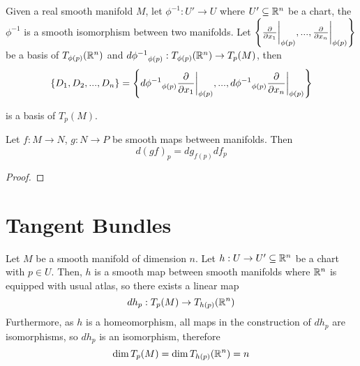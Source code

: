 \begin{remark}
	Given a real smooth manifold $M$, let $\phi^{-1}: U' \to U$ where $U' \subseteq \R^n$ be a chart, the $\phi^{-1}$ is a smooth isomorphism between two manifolds. Let $\set*{\frac{\partial}{\partial x_1}\bigg\vert_{\phi(p)}, ..., \frac{\partial}{\partial x_n}\bigg\vert_{\phi(p)}}$ be a basis of $T_{\phi(p)}(\R^n)$ and $d {\phi^{-1}}_{\phi(p)}: T_{\phi(p)}(\R^n) \to T_p(M)$, then
	$$
	\set{D_1, D_2, ..., D_n} = \set*{d {\phi^{-1}}_{\phi(p)}\frac{\partial}{\partial x_1}\bigg\vert_{\phi(p)}, ..., d {\phi^{-1}}_{\phi(p)}\frac{\partial}{\partial x_n}\bigg\vert_{\phi(p)}}
	$$
	
	is a basis of $T_p(M)$. 
\end{remark}

\begin{proposition}
	Let $f: M \to N$, $g: N \to P$ be smooth maps between manifolds. Then
	$$
	d(gf)_p = dg_{f(p)} df_p
	$$
	\begin{proof}
	\end{proof}
\end{proposition}

\section{Tangent Bundles}

\begin{proposition}
	Let $M$ be a smooth manifold of dimension $n$. Let $h: U \to U' \subseteq \R^n$ be a chart with $p \in U$. Then, $h$ is a smooth map between smooth manifolds where $\R^n$ is equipped with usual atlas, so there exists a linear map
	$$
	dh_p: T_p(M) \to T_{h(p)}(\R^n)
	$$
	Furthermore, as $h$ is a homeomorphism, all maps in the construction of $dh_p$ are isomorphisms, so $dh_p$ is an isomorphism, therefore
	$$
	\dim T_p(M) = \dim T_{h(p)}(\R^n) = n
	$$
\end{proposition}

